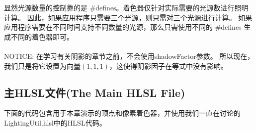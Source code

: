 \begin{flushleft}
显然光源数量的控制靠的是 \#defines。着色器仅针对实际需要的光源数进行照明计算。 因此，如果应用程序只需要三个光源，则只需对三个光源进行计算。 如果应用程序需要在不同时间支持不同数量的光源，那么只需使用不同的 \#defines 生成不同的着色器即可。\\
~\\
NOTICE: 在学习有关阴影的章节之前，不会使用shadowFactor参数。 所以现在，我们只是将它设置为向量$(1,1,1)$，这使得阴影因子在等式中没有影响。
\end{flushleft}

\subsection{主HLSL文件(The Main HLSL File)}
\begin{flushleft}
下面的代码包含用于本章演示的顶点和像素着色器，并使用我们一直在讨论的LightingUtil.hlsl中的HLSL代码。
\end{flushleft}

